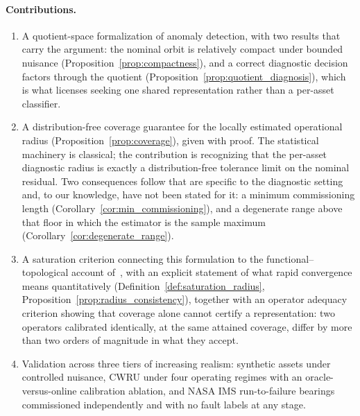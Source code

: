 \paragraph{Contributions.}
\begin{enumerate}
\item A quotient-space formalization of anomaly detection, with two results
      that carry the argument: the nominal orbit is relatively compact under
      bounded nuisance (Proposition~\ref{prop:compactness}), and a correct
      diagnostic decision factors through the quotient
      (Proposition~\ref{prop:quotient_diagnosis}), which is what licenses
      seeking one shared representation rather than a per-asset classifier.

\item A distribution-free coverage guarantee for the locally estimated
      operational radius (Proposition~\ref{prop:coverage}), given with proof.
      The statistical machinery is classical; the contribution is recognizing
      that the per-asset diagnostic radius is exactly a distribution-free
      tolerance limit on the nominal residual. Two consequences follow that
      are specific to the diagnostic setting and, to our knowledge, have not
      been stated for it: a minimum commissioning length
      (Corollary~\ref{cor:min_commissioning}), and a degenerate range above
      that floor in which the estimator is the sample maximum
      (Corollary~\ref{cor:degenerate_range}).

\item A saturation criterion connecting this formulation to the
      functional--topological account of~\citet{disanti2026blueprints}, with
      an explicit statement of what rapid convergence means quantitatively
      (Definition~\ref{def:saturation_radius},
      Proposition~\ref{prop:radius_consistency}), together with an operator
      adequacy criterion showing that coverage alone cannot certify a
      representation: two operators calibrated identically, at the same
      attained coverage, differ by more than two orders of magnitude in what
      they accept.

\item Validation across three tiers of increasing realism: synthetic assets
      under controlled nuisance, CWRU under four operating regimes with an
      oracle-versus-online calibration ablation, and NASA IMS run-to-failure
      bearings commissioned independently and with no fault labels at any
      stage.
\end{enumerate}

